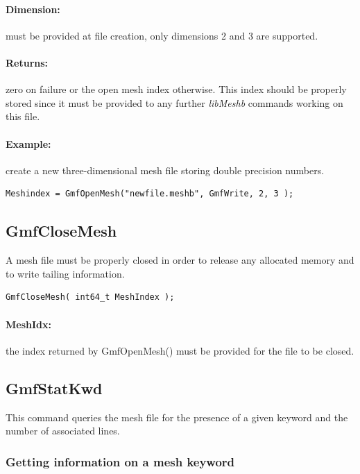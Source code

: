 \documentclass[a4paper,12pt]{article}
\begin{document}
\paragraph{Dimension:}
must be provided at file creation, only dimensions 2 and 3 are supported.

\paragraph{Returns:}
zero on failure or the open mesh index otherwise. This index should be properly stored since it must be provided to any further \emph{libMeshb} commands working on this file.

\paragraph{Example:} create a new three-dimensional mesh file storing double precision numbers.

\begin{tt}
\begin{verbatim}
Meshindex = GmfOpenMesh("newfile.meshb", GmfWrite, 2, 3 );
\end{verbatim}
\end{tt}
\normalfont


\subsection{GmfCloseMesh}
A mesh file must be properly closed in order to release any allocated memory and to write tailing information.

\begin{tt}
\begin{verbatim}
GmfCloseMesh( int64_t MeshIndex );
\end{verbatim}
\end{tt}
\normalfont

\paragraph{MeshIdx:}
the index returned by GmfOpenMesh() must be provided for the file to be closed.


\subsection{GmfStatKwd}
This command queries the mesh file for the presence of a given keyword and the number of associated lines.


\subsubsection{Getting information on a mesh keyword}
\end{document}
